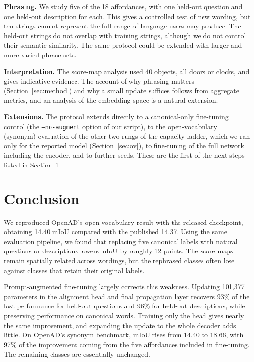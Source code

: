 \documentclass[conference]{IEEEtran}
\begin{document}
\textbf{Phrasing.} We study five of the 18 affordances, with one held-out question and one held-out description for each. This gives a controlled test of new wording, but ten strings cannot represent the full range of language users may produce. The held-out strings do not overlap with training strings, although we do not control their semantic similarity. The same protocol could be extended with larger and more varied phrase sets.

\textbf{Interpretation.} The score-map analysis used 40 objects, all doors or clocks, and gives indicative evidence. The account of why phrasing matters (Section~\ref{sec:method}) and why a small update suffices follows from aggregate metrics, and an analysis of the embedding space is a natural extension.

\textbf{Extensions.} The protocol extends directly to a canonical-only fine-tuning control (the \texttt{--no-augment} option of our script), to the open-vocabulary (synonym) evaluation of the other two rungs of the capacity ladder, which we ran only for the reported model (Section~\ref{sec:ov}), to fine-tuning of the full network including the encoder, and to further seeds. These are the first of the next steps listed in Section~\ref{sec:conclusion}.

\section{Conclusion}
\label{sec:conclusion}

We reproduced OpenAD's open-vocabulary result with the released checkpoint, obtaining 14.40 mIoU compared with the published 14.37. Using the same evaluation pipeline, we found that replacing five canonical labels with natural questions or descriptions lowers mIoU by roughly 12 points. The score maps remain spatially related across wordings, but the rephrased classes often lose against classes that retain their original labels.

Prompt-augmented fine-tuning largely corrects this weakness. Updating 101,377 parameters in the alignment head and final propagation layer recovers 93\% of the lost performance for held-out questions and 96\% for held-out descriptions, while preserving performance on canonical words. Training only the head gives nearly the same improvement, and expanding the update to the whole decoder adds little. On OpenAD's synonym benchmark, mIoU rises from 14.40 to 18.66, with 97\% of the improvement coming from the five affordances included in fine-tuning. The remaining classes are essentially unchanged.
\end{document}
